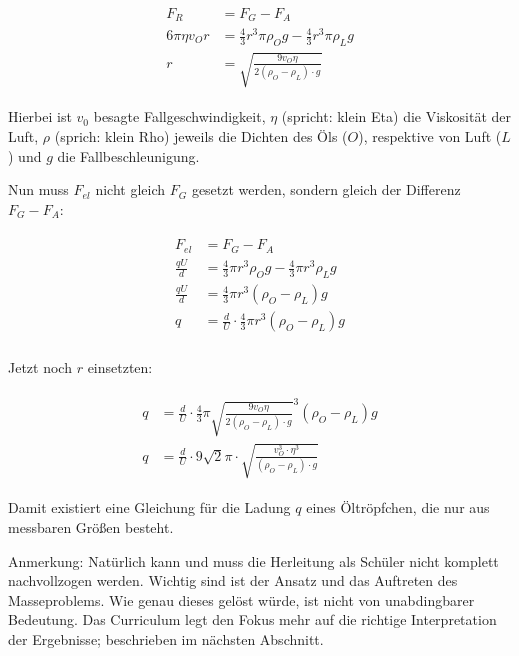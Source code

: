 \begin{align} \label{eq:StokesReibungFuerR}
\begin{split}
	F_R &= F_G - F_A \\
	6 \pi \eta v_O r &= \frac{4}{3} r^3 \pi \rho_{O} g - \frac{4}{3} r^3 \pi \rho_{L} g \\
	r &= \sqrt{\frac{9v_{O}\eta}{2(\rho_{O}-\rho_{L}) \cdot g}}
\end{split}
\end{align}

Hierbei ist $v_{0}$ besagte Fallgeschwindigkeit, $\eta$ (spricht: \glqq klein Eta\grqq) die Viskosität der Luft, $\rho$ (sprich: \glqq klein Rho\grqq) jeweils die Dichten des Öls ($O$), respektive von Luft ($L$) und $g$ die Fallbeschleunigung.

Nun muss $F_{el}$ nicht gleich $F_{G}$ gesetzt werden, sondern gleich der Differenz $F_{G} - F_{A}$:

\begin{align}
\begin{split}
	F_{el} &= F_G - F_A \\
	\frac{qU}{d} &= \frac{4}{3} \pi r^3 \rho_{O} g - \frac{4}{3} \pi r^3\rho_{L} g \\
	\frac{qU}{d} &= \frac{4}{3} \pi  r^3(\rho_{O} - \rho_{L}) g \\
	q &= \frac{d}{U} \cdot \frac{4}{3} \pi r^3 (\rho_{O} - \rho_{L}) g \\
\end{split}
\end{align}

Jetzt noch $r$ einsetzten:

\begin{align}
\begin{split}
	q &= \frac{d}{U} \cdot \frac{4}{3} \pi \sqrt{\frac{9v_{O}\eta}{2(\rho_{O}-\rho_{L}) \cdot g}}^3 (\rho_{O} - \rho_{L}) g \\
	q &= \frac{d}{U} \cdot 9\sqrt{2} \pi \cdot \sqrt{\frac{v_{O}^3 \cdot \eta^3}{(\rho_O - \rho_L) \cdot g}}
\end{split}
\end{align}

Damit existiert eine Gleichung für die Ladung $q$ eines Öltröpfchen, die nur aus messbaren Größen besteht.

\begin{leftbar}
Anmerkung: Natürlich kann und muss die Herleitung als Schüler nicht komplett nachvollzogen werden. Wichtig sind ist der Ansatz und das Auftreten des Masseproblems. Wie genau dieses gelöst würde, ist nicht von unabdingbarer Bedeutung. Das Curriculum legt den Fokus mehr auf die richtige Interpretation der Ergebnisse; beschrieben im nächsten Abschnitt.
\end{leftbar}


